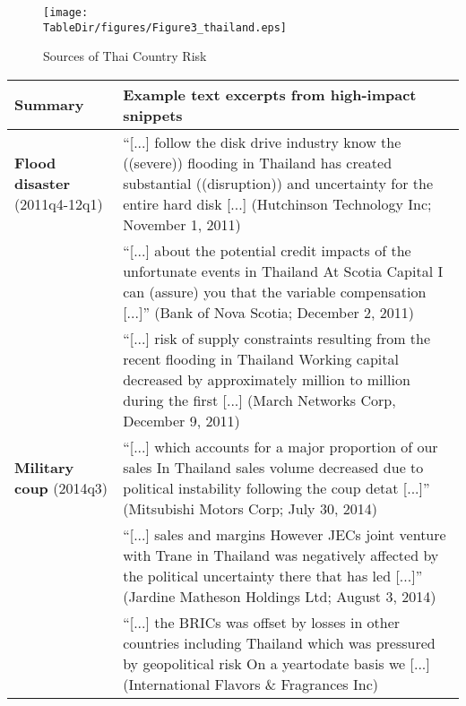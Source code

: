 \documentclass[12pt,oneside,leqno]{article}
\newcommand*{\TableDir}{.}
\begin{document}
\clearpage
\begin{figure}[!h]
\centering\caption{Sources of Thai Country Risk} \label{tab:thailand}
\texttt{[image: \\TableDir/figures/Figure3\_thailand.eps]}
\end{figure}

\begin{minipage}[t]{.92\textwidth}
\footnotesize
\begin{tabular}{p{}p{}}
\toprule
Summary & Example text excerpts from high-impact snippets \\\midrule
\textbf{Flood disaster} \newline (2011q4-12q1) & ``[...] follow the disk drive industry know the ((severe)) flooding in {Thailand} has created substantial ((disruption)) and {uncertainty} for the entire hard disk [...] (Hutchinson Technology Inc; November 1, 2011) \\
& ``[...] about the potential credit impacts of the unfortunate events in {Thailand} At Scotia Capital I can (assure) you that the {variable} compensation [...]'' (Bank of Nova Scotia; December 2, 2011) \\
& ``[...] {risk} of supply constraints resulting from the recent flooding in {Thailand} Working capital decreased by approximately million to million during the first [...] (March Networks Corp, December 9, 2011) \\\addlinespace
\textbf{Military coup} \newline (2014q3) & ``[...] which accounts for a major proportion of our sales In {Thailand} sales volume decreased due to political {instability} following the coup detat [...]'' (Mitsubishi Motors Corp; July 30, 2014) \\
& ``[...] sales and margins However JECs joint venture with Trane in {Thailand} was negatively affected by the political {uncertainty} there that has led [...]'' (Jardine Matheson Holdings Ltd; August 3, 2014) \\
& ``[...] the BRICs was offset by losses in other countries including {Thailand} which was pressured by geopolitical {risk} On a yeartodate basis we [...] (International Flavors \& Fragrances Inc) \\\bottomrule
\end{tabular}
\end{minipage}
\vspace{.05in}
\end{document}
